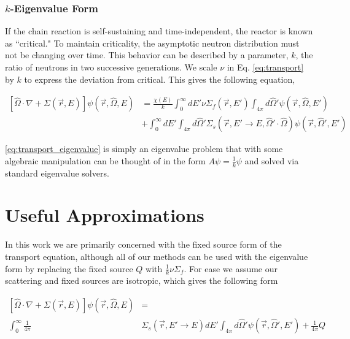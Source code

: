\subsubsection{$k$-Eigenvalue Form}
If the chain reaction is self-sustaining and time-independent, the reactor is known as ``critical." To maintain criticality, the asymptotic neutron distribution must not be changing over time. This behavior can be described by a parameter,  $k$, the ratio of neutrons in two successive generations. We scale $\nu$ in Eq. \eqref{eq:transport} by $k$ to express the deviation from critical. This gives the following equation,

\begin{equation}
    \label{eq:transport_eigenvalue}
    \begin{split}
        [\hat{\Omega} \cdot \nabla + \Sigma(\vec{r}, E)]\psi(\vec{r}, \hat{\Omega}, E) &= \frac{\chi(E)}{k} \int_0^\infty dE' \nu \Sigma_{f}(\vec{r}, E') \int_{4\pi} d\hat{\Omega}'\psi(\vec{r}, \hat{\Omega}, E') \\ &+ \int_0^\infty dE' \int_{4\pi} d\hat{\Omega}' \Sigma_s(\vec{r}, E' \rightarrow E, \hat{\Omega}' \cdot \hat{\Omega})\psi(\vec{r}, \hat{\Omega}', E') 
    \end{split}
\end{equation}

\eqref{eq:transport_eigenvalue} is simply an eigenvalue problem that with some algebraic manipulation can be thought of in the form $A\psi = \frac{1}{k} \psi$ and solved via standard eigenvalue solvers. 

\section{Useful Approximations}
In this work we are primarily concerned with the fixed source form of the transport equation, although all of our methods can be used with the eigenvalue form by replacing the fixed source $Q$ with $\frac{1}{k}\nu\Sigma_f$. For ease we assume our scattering and fixed sources are isotropic, which gives the following form

\begin{equation}
\begin{split}
 [\hat{\Omega} \cdot \nabla + \Sigma(\vec{r}, E)]\psi(\vec{r}, \hat{\Omega}, E) &= \\  \int_0^\infty \frac{1}{4\pi} &\Sigma_s(\vec{r}, E' \rightarrow E)  dE' \int_{4\pi} d\hat{\Omega}'\psi(\vec{r}, \hat{\Omega}', E')  + \frac{1}{4\pi}Q 
\end{split}
 \label{eq:transport_isotropic_scattering}
\end{equation}


